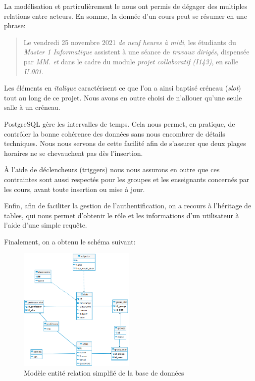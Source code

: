 \documentclass[a4paper,french,final]{memoir}
\begin{document}
La modélisation et particulièrement le  nous ont permis de dégager des multiples relations entre acteurs.
En somme, la donnée d'un cours peut se résumer en une phrase:

\begin{quote}
    Le vendredi 25 novembre 2021 \textit{de neuf heures à midi}, les étudiants du \textit{Master 1 Informatique} assistent à  une séance de \textit{travaux dirigés}, dispensée par \textit{MM.  et } dans le cadre du module \textit{projet collaboratif (I143)}, en salle \textit{U.001}.
\end{quote}
Les éléments en \textit{italique} caractérisent ce que l'on a ainsi baptisé créneau (\textit{slot}) tout au long de ce projet. 
Nous avons en outre choisi de n'allouer qu'une seule salle à un créneau. 

PostgreSQL gère les intervalles de temps. Cela nous permet, en pratique, de contrôler la bonne cohérence des données sans nous encombrer de détails techniques. 
Nous nous servons de cette facilité afin de s'assurer que deux plages horaires ne se chevauchent pas dès l'insertion. 

À l'aide de déclencheurs (triggers) nous nous assurons en outre que ces contraintes sont aussi respectés pour les groupes et les enseignants concernés par les cours, avant toute insertion ou mise à jour. 

Enfin, afin de faciliter la gestion de l'authentification, on a recours à l'héritage de tables, qui nous permet d'obtenir le rôle et les informations d'un utilisateur à l'aide d'une simple requête. 

Finalement, on a obtenu le schéma suivant:
\begin{figure}[h]
    \centering
    \includegraphics[width=0.5\textwidth]{figures/diagdb.png}
    \caption[Schéma de la B.D.]{Modèle entité relation simplfié de la base de données}
    \label{fig:schemadb}
\end{figure}
\end{document}
